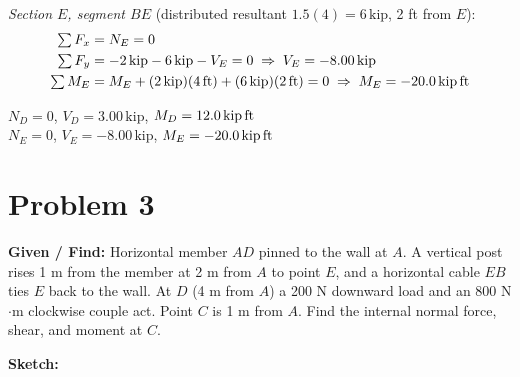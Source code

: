 \documentclass[11pt]{article}
\newcommand{\un}[1]{\,\text{#1}}
\begin{document}
\textit{Section $E$, segment $BE$} (distributed resultant $1.5(4) = 6\un{kip}$, 2 ft from $E$):
\begin{align*}
\textstyle\sum F_x &= N_E = 0\\
\textstyle\sum F_y &= -2\un{kip} - 6\un{kip} - V_E = 0 \;\Rightarrow\; V_E = -8.00\un{kip}\\
\textstyle\sum M_E &= M_E + (2\un{kip})(4\un{ft}) + (6\un{kip})(2\un{ft}) = 0 \;\Rightarrow\; M_E = -20.0\un{kip\,ft}
\end{align*}

\begin{finalanswer}
$N_D = 0$, \quad $V_D = 3.00\un{kip}$, \quad $M_D = 12.0\un{kip\,ft}$\\[4pt]
$N_E = 0$, \quad $V_E = -8.00\un{kip}$, \quad $M_E = -20.0\un{kip\,ft}$
\end{finalanswer}

\clearpage
\section*{Problem 3}

\textbf{Given / Find:} Horizontal member $AD$ pinned to the wall at $A$. A vertical post rises 1 m from the member at 2 m from $A$ to point $E$, and a horizontal cable $EB$ ties $E$ back to the wall. At $D$ (4 m from $A$) a 200 N downward load and an 800 N$\cdot$m clockwise couple act. Point $C$ is 1 m from $A$. Find the internal normal force, shear, and moment at $C$.

\textbf{Sketch:}
\end{document}
